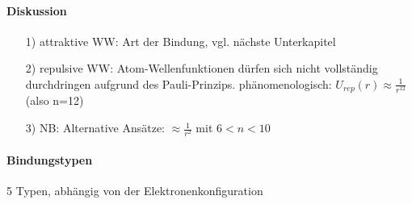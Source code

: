 \paragraph{Diskussion}
	\begin{itemize}
		\item[1)] attraktive WW: Art der Bindung, vgl. nächste Unterkapitel
		\item[2)] repulsive WW: Atom-Wellenfunktionen dürfen sich nicht vollständig durchdringen aufgrund des Pauli-Prinzips. phänomenologisch: $U_{rep}(r)\approx \frac{1}{r^{12}}$(also n=12)
		\item[3)] NB: Alternative Ansätze: $\approx \frac{1}{r^2}$ mit $6<n<10$
	\end{itemize}

\paragraph{Bindungstypen}
	5 Typen, abhängig von der Elektronenkonfiguration
